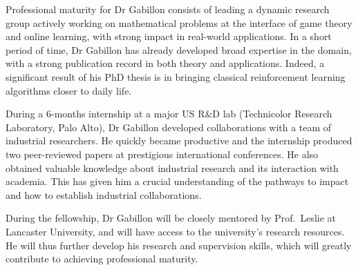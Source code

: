 Professional maturity for Dr Gabillon consists of leading a dynamic research group actively working on mathematical problems at the interface of game theory and online learning, with strong impact in real-world applications. In a short period of time, Dr Gabillon has already developed broad expertise in the domain, with a strong publication record in both theory and applications. Indeed, a significant result of his PhD thesis is in bringing classical reinforcement learning algorithms closer to daily life.

During  a 6-months internship at a major US R\&D lab (Technicolor Research Laboratory, Palo Alto), Dr Gabillon developed collaborations with a team of industrial researchers. He quickly became productive and the internship produced two peer-reviewed papers at prestigious international conferences. He also obtained valuable knowledge about industrial research and its interaction with academia. This has given him a crucial understanding of the pathways to impact and how to establish industrial collaborations.

During the fellowship, Dr Gabillon will be closely mentored by Prof.\ Leslie at Lancaster University, and will have access to the university's research resources. He will thus further develop his research and supervision skills, which will greatly contribute to achieving professional maturity.%